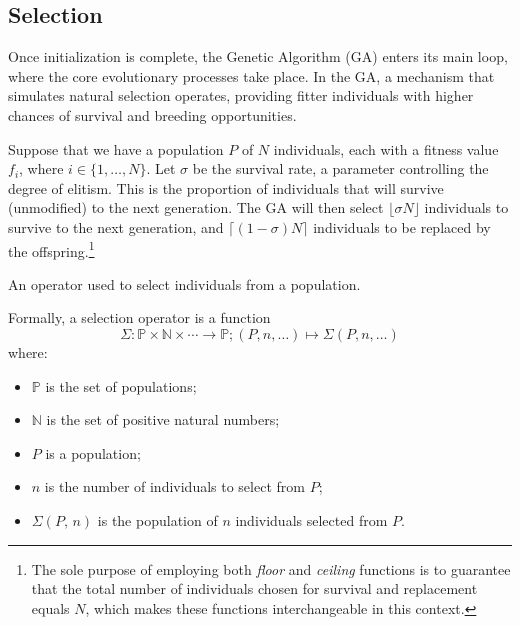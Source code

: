 \subsection{Selection}
\label{sec:background:genetic_algorithms:selection}
  Once initialization is complete, the Genetic Algorithm (GA) enters its main loop, where the core 
  evolutionary processes take place.
  In the GA, a mechanism that simulates natural selection operates, providing fitter individuals 
  with higher chances of survival and breeding opportunities.

  Suppose that we have a population \(P\) of \(N\) individuals, each with a fitness value \(f_i\), 
  where \(i \in \{1, \ldots, N\}\).
  Let \(\sigma\) be the survival rate, a parameter controlling the degree of elitism.
  This is the proportion of individuals that will survive (unmodified) to the next generation.
  The GA will then select \(\lfloor\sigma N\rfloor\) individuals to survive to the next generation,
  and \(\lceil(1 - \sigma)N\rceil\) individuals to be replaced by the offspring.\footnote{
    The sole purpose of employing both \textit{floor} and \textit{ceiling} functions is to guarantee
    that the total number of individuals chosen for survival and replacement equals \(N\), which
    makes these functions interchangeable in this context.
  }

  \begin{definition}
    \label{def:selection_operator}
      An operator used to select individuals from a population.

      Formally, a selection operator is a function 
      \[
        \Sigma : \mathbb{P} \times \mathbb{N} \times \cdots \to \mathbb{P};
        (P, n, \dots) \mapsto \Sigma(P, n, \dots)
      \]
      where: 
      
      \begin{itemize}
        \item \(\mathbb{P}\) is the set of populations;
        \item \(\mathbb{N}\) is the set of positive natural numbers;
        \item \(P\) is a population;
        \item \(n\) is the number of individuals to select from \(P\);
        \item \(\Sigma(P,\, n)\) is the population of \(n\) individuals selected
          from \(P\).
      \end{itemize}
  \end{definition}

